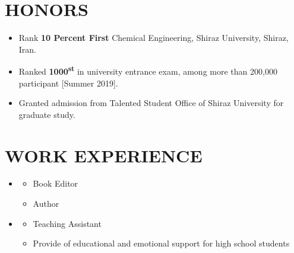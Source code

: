 \documentclass[10pt,a4paper,sans]{moderncv} %
\begin{document}
	\vspace{-0.9em}
	\section{HONORS}
	
	\begin{itemize}
		\item  Rank \textbf{10 Percent First} Chemical Engineering,
		Shiraz University, Shiraz, Iran.
		\item Ranked \textbf {1000\textsuperscript{st} } in university entrance exam, among more than 200,000
		participant [Summer 2019].
		
		\item Granted admission from Talented Student Office of Shiraz University for graduate study. 
		
		
	\end{itemize}
	
	\vspace{ 1.3 em}
	
	\vspace{-2.3em}
	\section{WORK EXPERIENCE}

	\begin{itemize}
		\item \href{https://kheilisabz.com/}{}
		
		
		\begin{itemize}
			
			\item Book Editor
				\item Author

		\end{itemize}
	\end{itemize}
	
	
	\vspace{0.71 em}
	
		\begin{itemize}
		
		\item \href{https://www.kanoon.ir/}{}
		
		
		\begin{itemize}
			
			\item Teaching Assistant
				\item Provide of educational and emotional support for high school students

		\end{itemize}
	\end{itemize}
	
\end{document}
